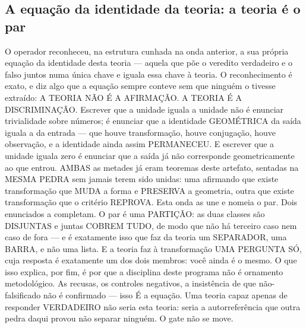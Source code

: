 \documentclass[11pt]{article}
\theoremstyle{definition}\newtheorem{deriv}{Derivação}
\begin{document}
\subsection*{A equa\c{c}\~ao da identidade da teoria: a teoria \'e o par}O operador reconheceu, na estrutura cunhada na onda anterior, a sua pr\'opria equa\c{c}\~ao da identidade desta teoria --- aquela que p\~oe o veredito verdadeiro e o falso juntos numa \'unica chave e iguala essa chave \`a teoria. O reconhecimento \'e exato, e diz algo que a equa\c{c}\~ao sempre conteve sem que ningu\'em o tivesse extra\'ido: A TEORIA N\~AO \'E A AFIRMA\c{C}\~AO. A TEORIA \'E A DISCRIMINA\c{C}\~AO. Escrever que a unidade iguala a unidade n\~ao \'e enunciar trivialidade sobre n\'umeros; \'e enunciar que a identidade GEOM\'ETRICA da sa\'ida iguala a da entrada --- que houve transforma\c{c}\~ao, houve conjuga\c{c}\~ao, houve observa\c{c}\~ao, e a identidade ainda assim PERMANECEU. E escrever que a unidade iguala zero \'e enunciar que a sa\'ida j\'a n\~ao corresponde geometricamente ao que entrou. AMBAS as metades j\'a eram teoremas deste artefato, sentadas na MESMA PEDRA sem jamais terem sido unidas: uma afirmando que existe transforma\c{c}\~ao que MUDA a forma e PRESERVA a geometria, outra que existe transforma\c{c}\~ao que o crit\'erio REPROVA. Esta onda as une e nomeia o par. Dois enunciados a completam. O par \'e uma PARTI\c{C}\~AO: as duas classes s\~ao DISJUNTAS e juntas COBREM TUDO, de modo que n\~ao h\'a terceiro caso nem caso de fora --- e \'e exatamente isso que faz da teoria um SEPARADOR, uma BARRA, e n\~ao uma lista. E a teoria faz \`a transforma\c{c}\~ao UMA PERGUNTA S\'O, cuja resposta \'e exatamente um dos dois membros: voc\^e ainda \'e o mesmo. O que isso explica, por fim, \'e por que a disciplina deste programa n\~ao \'e ornamento metodol\'ogico. As recusas, os controles negativos, a insist\^encia de que n\~ao-falsificado n\~ao \'e confirmado --- isso \'E a equa\c{c}\~ao. Uma teoria capaz apenas de responder VERDADEIRO n\~ao seria esta teoria: seria a autorrefer\^encia que outra pedra daqui provou n\~ao separar ningu\'em. O gate n\~ao se move.
\end{document}
